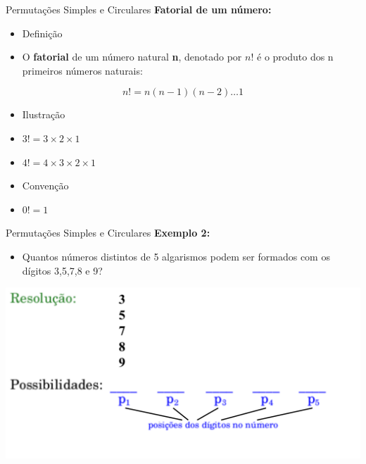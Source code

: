 \documentclass[aspectratio=169]{beamer}
\begin{document}
\begin{frame}{Permutações Simples e Circulares}
    \textbf{Fatorial de um número:}

    \vspace{2mm}

    \begin{itemize}
        \item Definição
        \item[] O \textbf{fatorial} de um número natural \textbf{n}, denotado por $n!$ é o produto dos n primeiros números naturais:
    \end{itemize}

    $$ n! = n(n-1)(n-2) \ldots 1 $$

    \pause 
    \begin{itemize}
        \item Ilustração
        \item[] $ 3! = 3 \times 2 \times 1$
        \item[] $ 4! = 4 \times 3 \times 2 \times 1$
    \end{itemize}

    \pause
    \begin{itemize}
        \item Convenção
        \item[] $0! = 1$
    \end{itemize}
\end{frame}

\begin{frame}{Permutações Simples e Circulares}
    \textbf{Exemplo 2:}

    \vspace{3mm}

    \begin{itemize}
        \item[] Quantos números distintos de 5 algarismos podem ser formados com os dígitos 3,5,7,8 e 9?
    \end{itemize}

    \begin{center}
        \includegraphics[width=0.75\linewidth]{figs/Exemplo2_1.png}
    \end{center}
\end{frame}
\end{document}
